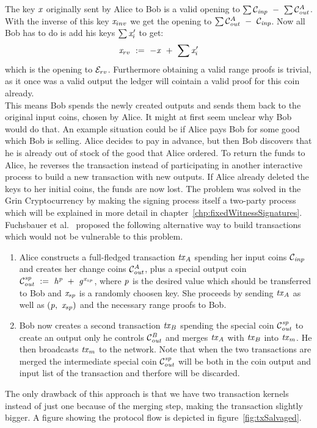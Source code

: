 The key $\mathit{x}$ originally sent by Alice to Bob is a valid opening to $\sum{\mathcal{C}_{\mathit{inp}}} ~-~ \sum{\mathcal{C}_{\mathit{out}}^A}$. With the inverse of this key $\mathit{x}_{inv}$ we get the opening to $\sum{\mathcal{C}_{\mathit{out}}^A ~-~\mathcal{C}_{\mathit{inp}}}$.
Now all Bob has to do is add his keys $\sum{\mathit{x}'_i}$ to get:
\[ \mathit{x}_{rv} ~:=~ -\mathit{x} ~+~ \sum{\mathit{x}'_i} \]
which is the opening to $\mathcal{E}_{rv}$. Furthermore obtaining a valid range proofs is trivial, as it once was a valid output the ledger will cointain a valid proof for this coin already. \\
This means Bob spends the newly created outputs and sends them back to the original input coins, chosen by Alice. It might at first seem unclear why Bob would do that. An example situation could be if Alice
pays Bob for some good which Bob is selling. Alice decides to pay in advance, but then Bob discovers that he is already out of stock of the good that Alice ordered. To return the funds to Alice, he reverses
the transaction instead of participating in another interactive process to build a new transaction with new outputs. If Alice already deleted the keys to her initial coins, the funds are now lost.
The problem was solved in the Grin Cryptocurrency by making the signing process itself a two-party process which will be explained in more detail in chapter~\ref{chp:fixedWitnessSignatures}. \\

Fuchsbauer et al.~\cite{fuchsbauer2019aggregate} proposed the following alternative way to build transactions which would not be vulnerable to this problem.
\begin{enumerate}
    \item Alice constructs a full-fledged transaction $\mathit{tx}_A$ spending her input coins $\mathcal{C}_{\mathit{inp}}$ and creates her change coins $\mathcal{C}_{\mathit{out}}^A$, plus a special output coin $\mathcal{C}_{\mathit{out}}^{\mathit{sp}} ~:=~ \mathit{h}^{\mathit{p}} ~+~ \mathit{g}^{\mathit{x}_{sp}}$,
    where $\mathit{p}$ is the desired value which should be transferred to Bob and $\mathit{x}_{sp}$ is a randomly choosen key. She proceeds by sending $\mathit{tx}_A$ as well as $(\mathit{p} ,~ \mathit{x}_{sp})$ and the necessary range
    proofs to Bob.
    \item Bob now creates a second transaction $\mathit{tx}_B$ spending the special coin $\mathcal{C}_{\mathit{out}}^{\mathit{sp}}$ to create an output only he controls $\mathcal{C}_{\mathit{out}}^{\mathit{B}}$ and merges $\mathit{tx}_A$ with $\mathit{tx}_B$
    into $\mathit{tx}_m$. He then broadcasts $\mathit{tx}_m$ to the network. Note that when the two transactions are merged the intermediate special coin $\mathcal{C}_{\mathit{out}}^{\mathit{sp}}$ will be both in the coin output and input list
    of the transaction and therfore will be discarded.
\end{enumerate}
The only drawback of this approach is that we have two transaction kernels instead of just one because of the merging step, making the transaction slightly bigger.
A figure showing the protocol flow is depicted in figure~\ref{fig:txSalvaged}.

